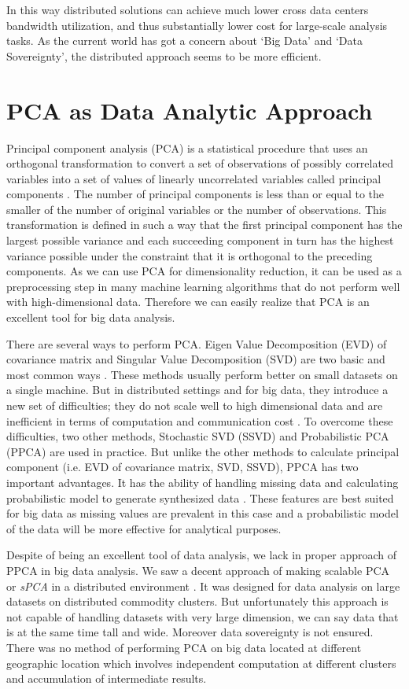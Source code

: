 \documentclass[10pt,conference,letterpaper]{IEEEtran}
\begin{document}
In this way distributed solutions can achieve much lower cross data centers bandwidth utilization, and thus substantially lower cost for large-scale analysis tasks. As the current world has got a concern about `Big Data' and `Data Sovereignty', the distributed approach seems to be more efficient. 

\section{PCA as Data Analytic Approach}
Principal component analysis (PCA) is a statistical procedure that uses an orthogonal transformation to convert a set of observations of possibly correlated variables into a set of values of linearly uncorrelated variables called principal components \cite{13}. The number of principal components is less than or equal to the smaller of the number of original variables or the number of observations. This transformation is defined in such a way that the first principal component has the largest possible variance and each succeeding component in turn has the highest variance possible under the constraint that it is orthogonal to the preceding components. As we can use PCA for dimensionality reduction, it can be used as a preprocessing step  in many machine learning algorithms that do not perform well with high-dimensional data. Therefore we can easily realize that PCA is an excellent tool for big data analysis. 

There are several ways to perform PCA. Eigen Value Decomposition (EVD) of covariance matrix and Singular Value Decomposition (SVD) are two basic and most common ways \cite{14}. These methods usually perform better on small datasets on a single machine. But in distributed settings and for big data, they introduce a new set of difficulties; they do not scale well to high dimensional data and are inefficient in terms of computation and communication cost \cite{elgamal}. To overcome these difficulties, two other methods, Stochastic SVD (SSVD) \cite{16} and Probabilistic PCA (PPCA) \cite{17} are used in practice. But unlike the other methods to calculate principal component (i.e. EVD of covariance matrix, SVD, SSVD), PPCA has two important advantages. It has the ability of handling missing data and calculating probabilistic model to generate synthesized data \cite{18}. These features are best suited for big data as missing values are prevalent in this case and a probabilistic model of the data will be more effective for analytical purposes.

Despite of being an excellent tool of data analysis, we lack in proper approach of PPCA in big data analysis. We saw a decent approach of making scalable PCA or \textit{sPCA} in a distributed environment  \cite{elgamal}.  It was designed for data analysis on large datasets on distributed commodity clusters. But unfortunately this approach is not capable of handling datasets with very large dimension, we can say data that is at the same time tall and wide. Moreover data sovereignty is not ensured. There was no method of performing PCA on big data located at different geographic location which involves independent computation at different clusters and accumulation of intermediate results. 
\end{document}

